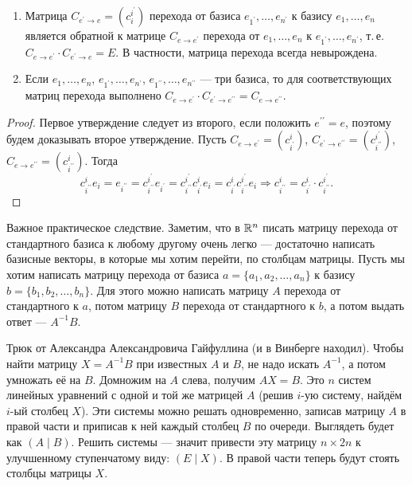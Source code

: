 \begin{proposal}
    \begin{enumerate}[nolistsep]
        \item Матрица $C_{e^\prime \to e} = (c^{i^\prime}_i)$ перехода от базиса $e_{1^\prime}, \ldots, e_{n^\prime}$ к базису $e_1, \ldots, e_n$ является обратной к матрице $C_{e \to e^\prime}$ перехода от $e_1, \ldots, e_n$ к $e_{1^\prime}, \ldots, e_{n^\prime}$, т.\,е. $C_{e \to e^\prime} \cdot C_{e^\prime \to e} = E$. В частности, матрица перехода всегда невырождена.
        \item Если $e_1, \ldots, e_n$, $e_{1^\prime}, \ldots, e_{n^\prime}$, $e_{1^{\prime\prime}}, \ldots, e_{n^{\prime\prime}}$ --- три базиса, то для соответствующих матриц перехода выполнено $C_{e \to e^\prime}\cdot C_{e^\prime \to e^{\prime\prime}} = C_{e \to e^{\prime\prime}}$.
    \end{enumerate}
\end{proposal}

\begin{proof}
    Первое утверждение следует из второго, если положить $e^{\prime\prime} = e$, поэтому будем доказывать второе утверждение. Пусть $C_{e \to e^\prime} = (c^i_{i^\prime})$, $C_{e^\prime \to e^{\prime\prime}} = (c^{i^\prime}_{i^{\prime\prime}})$, $C_{e \to e^{\prime\prime}} = (c^i_{i^{\prime\prime}})$. Тогда
    \[
        c^i_{i^{\prime\prime}}e_i = e_{i^{\prime\prime}} = c^{i^\prime}_{i^{\prime\prime}}e_{i^\prime} = c^{i^\prime}_{i^{\prime\prime}}c^i_{i^\prime}e_i = c^i_{i^\prime}c^{i^\prime}_{i^{\prime\prime}}e_i \Rightarrow c^i_{i^{\prime\prime}} = c^i_{i^\prime} \cdot c^{i^\prime}_{i^{\prime\prime}}.
    \]
\end{proof}

\begin{remark}
    Важное практическое следствие. Заметим, что в $\mathbb{R}^n$ писать матрицу перехода от стандартного базиса к любому другому очень легко --- достаточно написать базисные векторы, в которые мы хотим перейти, по столбцам матрицы. Пусть мы хотим написать матрицу перехода от базиса $a = \{a_1, a_2, \ldots, a_n\}$ к базису $b = \{b_1, b_2, \ldots, b_n\}$. Для этого можно написать матрицу $A$ перехода от стандартного к $a$, потом матрицу $B$ перехода от стандартного к $b$, а потом выдать ответ --- $A^{-1}B$.
\end{remark}

\begin{remark}
    Трюк от Александра Александровича Гайфуллина (и в Винберге находил). Чтобы найти матрицу $X = A^{-1}B$ при известных $A$ и $B$, не надо искать $A^{-1}$, а потом умножать её на $B$. Домножим на $A$ слева, получим $AX = B$. Это $n$ систем линейных уравнений с одной и той же матрицей $A$ (решив $i$-ую систему, найдём $i$-ый столбец $X$). Эти системы можно решать одновременно, записав матрицу $A$ в правой части и приписав к ней каждый столбец $B$ по очереди. Выглядеть будет как $(A \mid B)$. Решить системы --- значит привести эту матрицу $n \times 2n$ к улучшенному ступенчатому виду: $(E \mid X)$. В правой части теперь будут стоять столбцы матрицы $X$.
\end{remark}

